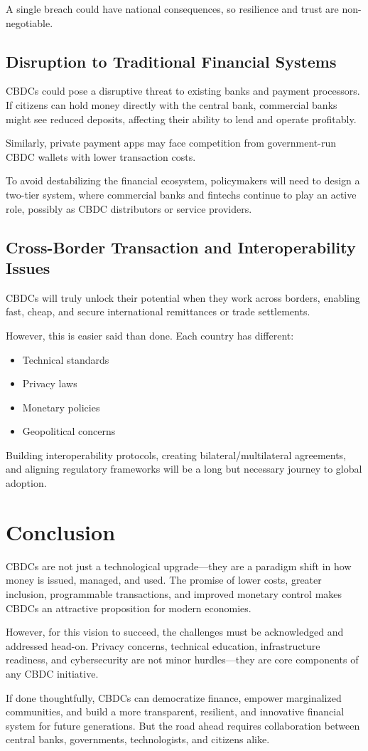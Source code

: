 A single breach could have national consequences, so resilience and trust are non-negotiable.

\subsection{Disruption to Traditional Financial Systems}
CBDCs could pose a disruptive threat to existing banks and payment processors. If citizens can hold money directly with the central bank, commercial banks might see reduced deposits, affecting their ability to lend and operate profitably.

Similarly, private payment apps may face competition from government-run CBDC wallets with lower transaction costs.

To avoid destabilizing the financial ecosystem, policymakers will need to design a two-tier system, where commercial banks and fintechs continue to play an active role, possibly as CBDC distributors or service providers.

\subsection{Cross-Border Transaction and Interoperability Issues}
CBDCs will truly unlock their potential when they work across borders, enabling fast, cheap, and secure international remittances or trade settlements.

However, this is easier said than done. Each country has different:

\begin{itemize}
    \item Technical standards
    \item Privacy laws
    \item Monetary policies
    \item Geopolitical concerns
\end{itemize}

Building interoperability protocols, creating bilateral/multilateral agreements, and aligning regulatory frameworks will be a long but necessary journey to global adoption.

\section{Conclusion}
CBDCs are not just a technological upgrade—they are a paradigm shift in how money is issued, managed, and used. The promise of lower costs, greater inclusion, programmable transactions, and improved monetary control makes CBDCs an attractive proposition for modern economies.

However, for this vision to succeed, the challenges must be acknowledged and addressed head-on. Privacy concerns, technical education, infrastructure readiness, and cybersecurity are not minor hurdles—they are core components of any CBDC initiative.

If done thoughtfully, CBDCs can democratize finance, empower marginalized communities, and build a more transparent, resilient, and innovative financial system for future generations. But the road ahead requires collaboration between central banks, governments, technologists, and citizens alike.

